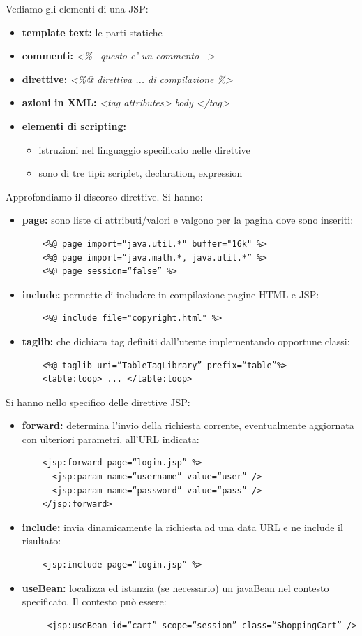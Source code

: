 \documentclass[a4paper,12pt, oneside]{book}
\begin{document}
Vediamo gli elementi di una JSP:
\begin{itemize}
	\item \textbf{template text:} le parti statiche
	\item \textbf{commenti:} \textit{<\%-- questo e’ un commento -->}
	\item \textbf{direttive:} \textit{<\%@ direttiva ... di compilazione \%>}
	\item \textbf{azioni in XML:} \textit{<tag attributes> body </tag>}
	\item \textbf{elementi di scripting:}
	\begin{itemize}
		\item istruzioni nel linguaggio specificato nelle direttive
		\item sono di tre tipi: scriplet, declaration, expression
	\end{itemize}
\end{itemize}
Approfondiamo il discorso direttive. Si hanno:
\begin{itemize}
	\item \textbf{page:} sono liste di attributi/valori e valgono per la pagina dove sono inseriti:
	\begin{verbatim}
    <%@ page import="java.util.*" buffer="16k" %>
    <%@ page import=“java.math.*, java.util.*” %>
    <%@ page session=“false” %>
	\end{verbatim}
	\item \textbf{include:} permette di includere in compilazione pagine HTML e JSP:
	\begin{verbatim}
    <%@ include file="copyright.html" %>
	\end{verbatim}
	\item \textbf{taglib:} che dichiara tag definiti dall'utente implementando opportune classi:
	\begin{verbatim}
    <%@ taglib uri=“TableTagLibrary” prefix=“table”%>
    <table:loop> ... </table:loop>
	\end{verbatim} 
\end{itemize}
Si hanno nello specifico delle direttive JSP:
\begin{itemize}
	\item \textbf{forward:} determina l'invio della richiesta corrente, eventualmente aggiornata con ulteriori parametri, all'URL indicata:
	\begin{verbatim}
    <jsp:forward page=“login.jsp” %> 
      <jsp:param name=“username” value=“user” />
      <jsp:param name=“password” value=“pass” />
    </jsp:forward>
	\end{verbatim}
	\item \textbf{include:} invia dinamicamente la richiesta ad una data URL e ne include il risultato:
	\begin{verbatim}
    <jsp:include page=“login.jsp” %>
	\end{verbatim}
	\newpage
	\item \textbf{useBean:} localizza ed istanzia (se necessario) un javaBean nel contesto specificato. Il contesto può essere:
	\begin{verbatim}
     <jsp:useBean id=“cart” scope=“session” class=“ShoppingCart” />
	\end{verbatim}
\end{itemize}
\end{document}

